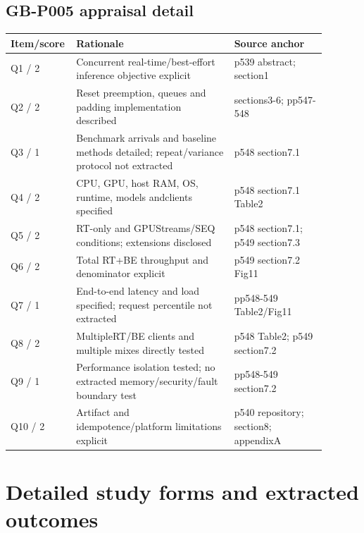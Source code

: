 \documentclass[12pt,a4paper]{article}
\begin{document}
\subsection{GB-P005 appraisal detail}
\begin{longtable}{p{0.13\linewidth}p{0.48\linewidth}p{0.28\linewidth}}
\toprule
Item/\allowbreak{}score & Rationale & Source anchor\\\midrule
\endhead
Q1 /\allowbreak{} 2 & Concurrent real-time/\allowbreak{}best-effort inference objective explicit & p539 abstract; section1\\
Q2 /\allowbreak{} 2 & Reset preemption, queues and padding implementation described & sections3-6; pp547-548\\
Q3 /\allowbreak{} 1 & Benchmark arrivals and baseline methods detailed; repeat/\allowbreak{}variance protocol not extracted & p548 section7.1\\
Q4 /\allowbreak{} 2 & CPU, GPU, host RAM, OS, runtime, models andclients specified & p548 section7.1 Table2\\
Q5 /\allowbreak{} 2 & RT-only and GPUStreams/\allowbreak{}SEQ conditions; extensions disclosed & p548 section7.1; p549 section7.3\\
Q6 /\allowbreak{} 2 & Total RT+BE throughput and denominator explicit & p549 section7.2 Fig11\\
Q7 /\allowbreak{} 1 & End-to-end latency and load specified; request percentile not extracted & pp548-549 Table2/\allowbreak{}Fig11\\
Q8 /\allowbreak{} 2 & MultipleRT/\allowbreak{}BE clients and multiple mixes directly tested & p548 Table2; p549 section7.2\\
Q9 /\allowbreak{} 1 & Performance isolation tested; no extracted memory/\allowbreak{}security/\allowbreak{}fault boundary test & pp548-549 section7.2\\
Q10 /\allowbreak{} 2 & Artifact and idempotence/\allowbreak{}platform limitations explicit & p540 repository; section8; appendixA\\
\bottomrule
\end{longtable}


\clearpage\section{Detailed study forms and extracted outcomes}
\end{document}
